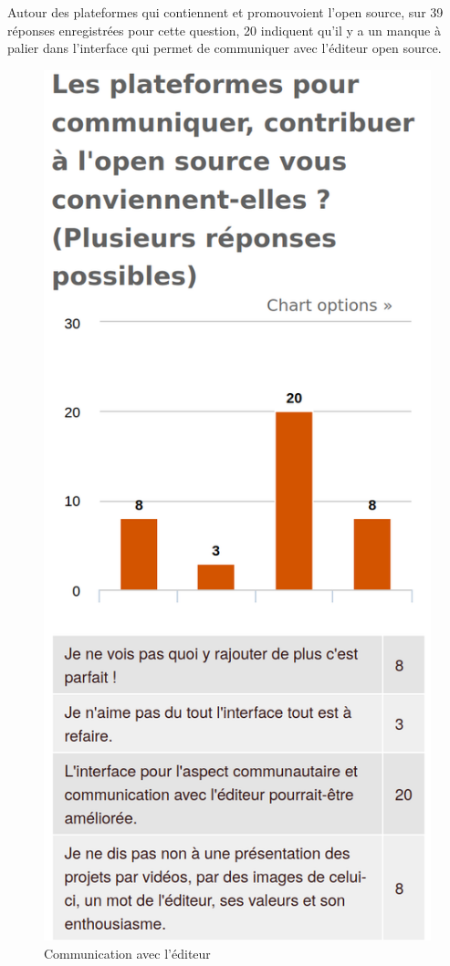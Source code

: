 			Autour des plateformes qui contiennent et promouvoient l'open source, sur 39 réponses enregistrées pour cette question, 20 indiquent qu'il y a un manque à palier dans l'interface qui permet de communiquer avec l'éditeur open source. 

			\begin{figure}[!htb]
				\center
				\includegraphics[scale=0.28]{./img/communicationediteur}
				\caption{Communication avec l'éditeur}
			\end{figure}

